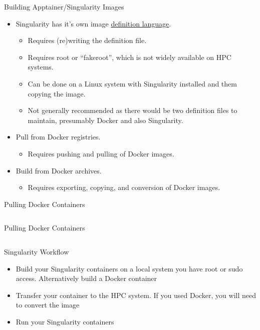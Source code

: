 \documentclass[aspectratio=169]{beamer}
\begin{document}
\begin{frame}{Building Apptainer/Singularity Images}
\begin{itemize}
\item Singularity has it's own image
\href{https://sylabs.io/guides/3.7/user-guide/definition_files.html}{definition
language}.
\begin{itemize}
\item Requires (re)writing the definition file.
\item Requires root or ``fakeroot'', which is not widely available on HPC
systems.
\item Can be done on a Linux system with Singularity installed and them copying
the image.
\item Not generally recommended as there would be two definition files to
maintain, presumably Docker and also Singularity.
\end{itemize}
\item Pull from Docker registries.
\begin{itemize}
\item Requires pushing and pulling of Docker images.
\end{itemize}
\item Build from Docker archives.
\begin{itemize}
\item Requires exporting, copying, and conversion of Docker images.
\end{itemize}
\end{itemize}
\end{frame}

\begin{frame}{Pulling Docker Containers}
\inputminted[firstline=0, lastline=8]{sh}{src/docker_buildx_singularity.sh}
\end{frame}

\begin{frame}{Pulling Docker Containers}
\inputminted[firstline=10]{sh}{src/docker_buildx_singularity.sh}
\end{frame}

\begin{frame}{Singularity Workflow}
\begin{itemize}
\item Build your Singularity containers on a local system you have root or sudo access. Alternatively build a Docker container
\item Transfer your container to the HPC system. If you used Docker, you will need to convert the image 
\item Run your Singularity containers
\end{itemize}
\end{frame}
\end{document}
